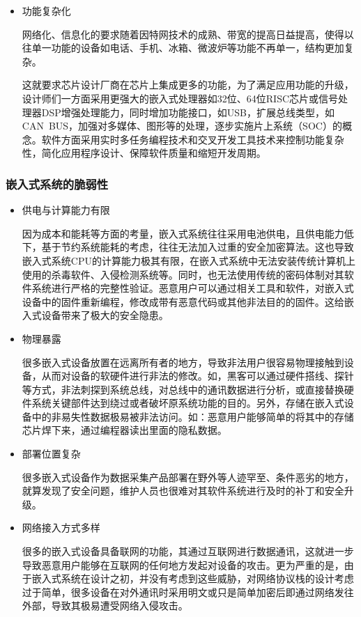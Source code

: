 \documentclass[12pt, a4paper]{article}
\begin{document}
\begin{itemize}
	\item 功能复杂化
	
	网络化、信息化的要求随着因特网技术的成熟、带宽的提高日益提高，使得以往单一功能的设备如电话、手机、冰箱、微波炉等功能不再单一，结构更加复杂。
	
	这就要求芯片设计厂商在芯片上集成更多的功能，为了满足应用功能的升级，设计师们一方面采用更强大的嵌入式处理器如32位、64位RISC芯片或信号处理器DSP增强处理能力，同时增加功能接口，如USB，扩展总线类型，如CAN BUS，加强对多媒体、图形等的处理，逐步实施片上系统（SOC）的概念。软件方面采用实时多任务编程技术和交叉开发工具技术来控制功能复杂性，简化应用程序设计、保障软件质量和缩短开发周期。
	\end{itemize}

	\subsubsection{嵌入式系统的脆弱性}
	\begin{itemize}
		\item 供电与计算能力有限
		
		因为成本和能耗等方面的考量，嵌入式系统往往采用电池供电，且供电能力低下，基于节约系统能耗的考虑，往往无法加入过重的安全加密算法。这也导致嵌入式系统CPU的计算能力极其有限，在嵌入式系统中无法安装传统计算机上使用的杀毒软件、入侵检测系统等。同时，也无法使用传统的密码体制对其软件系统进行严格的完整性验证。恶意用户可以通过相关工具和软件，对嵌入式设备中的固件重新编程，修改成带有恶意代码或其他非法目的的固件。这给嵌入式设备带来了极大的安全隐患。
		
		\item 物理暴露
		
		很多嵌入式设备放置在远离所有者的地方，导致非法用户很容易物理接触到设备，从而对设备的软硬件进行非法的修改。如，黑客可以通过硬件搭线、探针等方式，非法刺探到系统总线，对总线中的通讯数据进行分析，或直接替换硬件系统关键部件达到绕过或者破坏原系统功能的目的。另外，存储在嵌入式设备中的非易失性数据极易被非法访问。如：恶意用户能够简单的将其中的存储芯片焊下来，通过编程器读出里面的隐私数据。
		
		\item 部署位置复杂
		
		很多嵌入式设备作为数据采集产品部署在野外等人迹罕至、条件恶劣的地方，就算发现了安全问题，维护人员也很难对其软件系统进行及时的补丁和安全升级。
		
		\item 网络接入方式多样
		
		很多的嵌入式设备具备联网的功能，其通过互联网进行数据通讯，这就进一步导致恶意用户能够在互联网的任何地方发起对设备的攻击。更为严重的是，由于嵌入式系统在设计之初，并没有考虑到这些威胁，对网络协议栈的设计考虑过于简单，很多设备在对外通讯时采用明文或只是简单加密后即通过网络发往外部，导致其极易遭受网络入侵攻击。
	\end{itemize}
	
\end{document}
